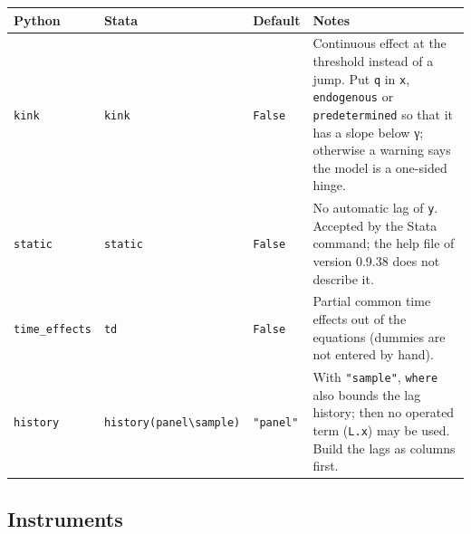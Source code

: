 \documentclass[
  10.5pt,
  a4paper,
]{article}
\newcounter{none} %
\begin{document}
{\def\LTcaptype{none} %
\begin{longtable}[]{@{}
  >{\raggedright\arraybackslash}p{}
  >{\raggedright\arraybackslash}p{}
  >{\raggedright\arraybackslash}p{}
  >{\raggedright\arraybackslash}p{}@{}}
\toprule\noalign{}
\begin{minipage}[b]{\linewidth}\raggedright
Python
\end{minipage} & \begin{minipage}[b]{\linewidth}\raggedright
Stata
\end{minipage} & \begin{minipage}[b]{\linewidth}\raggedright
Default
\end{minipage} & \begin{minipage}[b]{\linewidth}\raggedright
Notes
\end{minipage} \\
\midrule\noalign{}
\endhead
\bottomrule\noalign{}
\endlastfoot
\texttt{kink} & \texttt{kink} & \texttt{False} & Continuous effect at
the threshold instead of a jump. Put \texttt{q} in \texttt{x},
\texttt{endogenous} or \texttt{predetermined} so that it has a slope
below γ; otherwise a warning says the model is a one-sided hinge. \\
\texttt{static} & \texttt{static} & \texttt{False} & No automatic lag of
\texttt{y}. Accepted by the Stata command; the help file of version
0.9.38 does not describe it. \\
\texttt{time\_effects} & \texttt{td} & \texttt{False} & Partial common
time effects out of the equations (dummies are not entered by hand). \\
\texttt{history} &
\texttt{history(panel\textbackslash{}\textbar{}sample)} &
\texttt{"panel"} & With \texttt{"sample"}, \texttt{where} also bounds
the lag history; then no operated term (\texttt{L.x}) may be used. Build
the lags as columns first. \\
\end{longtable}
}

\subsection{Instruments}\label{instruments}
\end{document}

